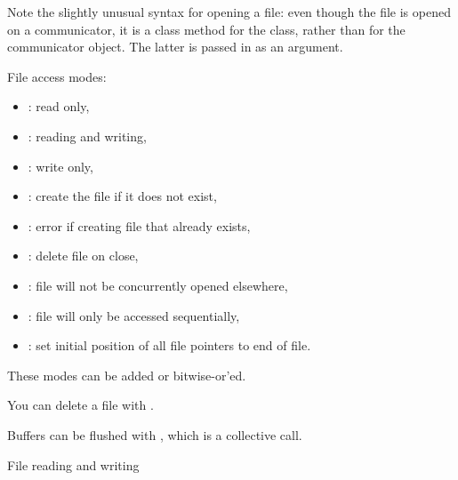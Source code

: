 \begin{pythonnote}
  Note the slightly unusual syntax for opening a file: even though the file is
  opened on a communicator, it is a class method for the 
  class, rather than for the communicator object. The latter is passed
  in as an argument.
\end{pythonnote}

File access modes:
\begin{itemize}
\item  {}: read only,
\item  {}: reading and writing,
\item  {}: write only,
\item  {}: create the file if it does not exist,
\item  {}: error if creating file that already exists,
\item  {}: delete file on close,
\item  {}: file will not be concurrently opened
  elsewhere,
\item  {}: file will only be accessed sequentially,
\item  {}: set initial position of all file pointers to end
  of file.
\end{itemize}
These modes can be added or bitwise-or'ed.

You can delete a file with .

Buffers can be flushed with , which is a collective call.

 {File reading and writing}

